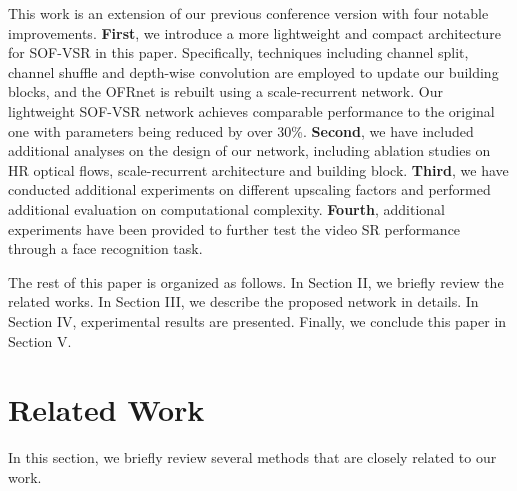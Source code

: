 \documentclass[journal]{IEEEtran}
\begin{document}
	This work is an extension of our previous conference version \cite{2018-LearningforVideoSuperResolutionthroughHROpticalFlowEstimation-LongguangWang--} with four notable improvements. \textbf{First}, we introduce a more lightweight and compact architecture for SOF-VSR in this paper. Specifically, techniques including channel split, channel shuffle and depth-wise convolution \cite{Ma2018a} are employed to update our building blocks, and the OFRnet is rebuilt using a scale-recurrent network. Our lightweight SOF-VSR network achieves comparable performance to the original one \cite{2018-LearningforVideoSuperResolutionthroughHROpticalFlowEstimation-LongguangWang--}  with parameters being reduced by over 30\%. \textbf{Second}, we have included additional analyses on the design of our network, including ablation studies on HR optical flows, scale-recurrent architecture and building block. \textbf{Third}, we have conducted additional experiments on different upscaling factors and performed additional evaluation on computational complexity. \textbf{Fourth}, additional experiments have been provided to further test the video SR performance through a face recognition task.
	
	
	The rest of this paper is organized as follows. In Section II, we briefly review the related works. In Section III, we describe the proposed network in details. In Section IV, experimental results are presented. Finally, we conclude this paper in Section V. 
	
	\section{Related Work}
	In this section, we briefly review several methods that are closely related to our work.
	
\end{document}
